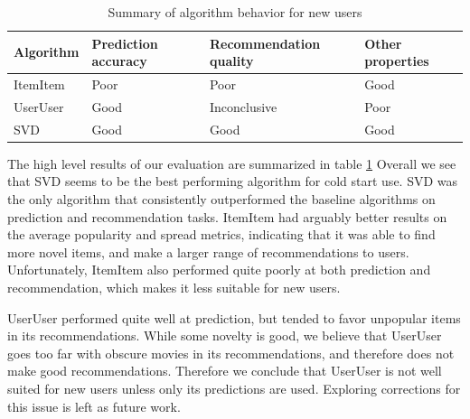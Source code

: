 \documentclass[letterpaper]{sig-alternate}
\begin{document}
    
  \begin{table}[ht!]
    \centering
    \begin{tabular}{|p{4.5em}|p{4.5em}|p{7.5em}|p{4.5em}|}
      \hline
      Algorithm & Prediction accuracy & Recommendation quality      & Other properties \\\hline
      ItemItem  & Poor                & Poor                        & Good             \\\hline
      UserUser  & Good                & Inconclusive                & Poor             \\\hline
      SVD       & Good                & Good                        & Good             \\\hline
    \end{tabular}
    \caption{Summary of algorithm behavior for new users}
    \label{tbl:results}
  \end{table}

  The high level results of our evaluation are summarized in table \ref{tbl:results}
  Overall we see that SVD seems to be the best performing algorithm for cold start use.
  SVD was the only algorithm that consistently outperformed the baseline algorithms on prediction and recommendation tasks.
  ItemItem had arguably better results on the average popularity and spread metrics, indicating that it was able to find more novel items, and make a larger range of recommendations to users.
  Unfortunately, ItemItem also performed quite poorly at both prediction and recommendation, which makes it less suitable for new users.

  UserUser performed quite well at prediction, but tended to favor unpopular items in its recommendations.
  While some novelty is good, we believe that UserUser goes too far with obscure movies in its recommendations, and therefore does not make good recommendations.
  Therefore we conclude that UserUser is not well suited for new users unless only its predictions are used.
  Exploring corrections for this issue is left as future work.
\end{document}
